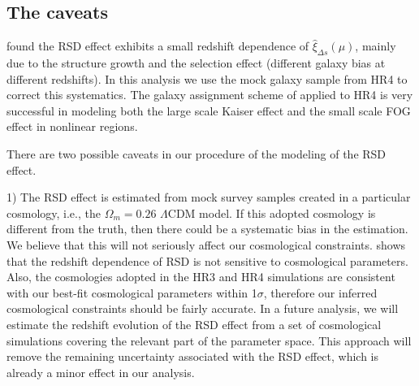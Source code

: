 \documentclass[iop]{emulateapj}
\begin{document}
\subsection{The caveats}\label{sec:caveats}

\cite{Li2014,Li2015} found the RSD effect exhibits a small redshift dependence of $\hat \xi_{\Delta s}(\mu)$, 
mainly due to the structure growth and the selection effect
(different galaxy bias at different redshifts).
In this analysis we use the mock galaxy sample from HR4 to correct this systematics.
The galaxy assignment scheme of \cite{hong2016} applied to HR4 is very successful in modeling both the 
large scale Kaiser effect and the small scale FOG effect in nonlinear regions.

There are two possible caveats in our procedure of the modeling of the RSD effect.

1) The RSD effect is estimated from mock survey samples created in a particular cosmology, 
i.e., the $\Omega_m=0.26$ $\Lambda$CDM model. %
If this adopted cosmology is different from the truth, then there could be a systematic bias in the estimation. %
We believe that this will not seriously affect our cosmological constraints.
\cite{Li2014} shows that the redshift dependence of RSD is not sensitive to cosmological parameters.
Also, the cosmologies adopted in the HR3 and HR4 simulations are consistent with our best-fit cosmological parameters within 1$\sigma$,
therefore our inferred cosmological constraints should be fairly accurate.
In a future analysis,
we will estimate the redshift evolution of the RSD effect from a set of cosmological simulations 
covering the relevant part of the parameter space.
This approach will remove the remaining uncertainty associated with the RSD effect, 
which is already a minor effect in our analysis.
\end{document}
